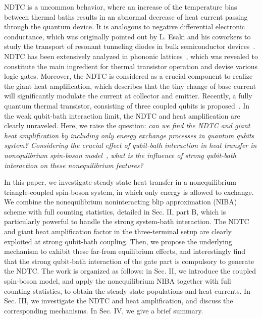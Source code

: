 \documentclass[twocolumn,preprintnumbers,amsmath,amssymb]{revtex4}
\begin{document}
NDTC is a uncommon behavior, where an increase of the temperature bias between thermal baths results in an abnormal decrease of heat current passing through the quantum device.
It is analogous to negative differential electronic conductance, which was originally pointed out by L. Esaki and his coworkers to study the transport of resonant tunneling diodes in bulk semiconductor devices~\cite{lesaki1958pr,llchang1974apl}.
NDTC has been extensively analyzed in phononic lattices~\cite{nbli2012rmp}, which was revealed to constitute the main ingredient for thermal transistor operation
and devise various logic gates.
Moreover, the NDTC is considered as a crucial component to realize the giant heat amplification,
which describes that the tiny change of base current will significantly modulate the current at collector and emitter.
Recently, a fully quantum thermal transistor, consisting of three coupled qubits is proposed~\cite{kjoulain2016prl}. %
In the weak qubit-bath interaction limit, the NDTC and heat amplification are clearly unraveled.
Here, we raise the question: \emph{can we find the NDTC and giant heat amplification by including only energy exchange processes in quantum qubits system?
Considering the crucial effect of qubit-bath interaction in heat transfer in nonequlibrium spin-boson model~\cite{ajleggett1987rmp,dvirasegal2006prb,dzxu2016njp},
what is the influence of strong qubit-bath interaction on these nonequilibrium features?}


In this paper, we investigate steady state heat transfer in a nonequilibrium triangle-coupled spin-boson system, in which only energy is allowed to exchange.
We combine the nonequilibrium noninteracting blip approximation (NIBA) scheme with full counting statistics, detailed in Sec. II, part B,
which is particularly powerful to handle the strong system-bath interaction.
The NDTC and giant heat amplification factor in the three-terminal setup are clearly exploited at strong qubit-bath coupling.
Then, we propose the underlying mechanism to exhibit these far-from equilibrium effects,
and interestingly find that the strong qubit-bath interaction of the gate part is compulsory to generate the NDTC.
The work is organized as follows:
in Sec. II, we introduce the coupled spin-boson model, and apply the nonequilibrium NIBA together with full counting statistics, to obtain the steady state populations and heat currents.
In Sec. III, we investigate the NDTC and heat amplification, and discuss the corresponding mechanisms.
In Sec. IV, we give a brief summary.
\end{document}

